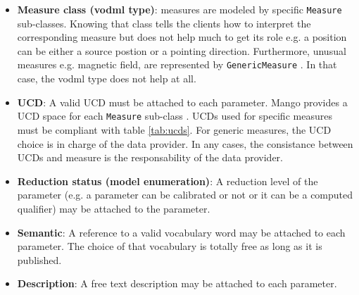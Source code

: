 \documentclass[11pt,a4paper]{ivoa}
\begin{document}
\begin{itemize}
    \item \textbf{Measure class (vodml type)}: measures are modeled by specific  \texttt{Measure} sub-classes.
              Knowing that class tells the clients  how to interpret the corresponding measure but does not help much to get its role e.g. a position can be either a source postion or a pointing direction.
              Furthermore, unusual measures e.g. magnetic field,  are represented by  \texttt{GenericMeasure} . 
              In that case, the vodml type does not help at all.
    \item \textbf{UCD}: A valid UCD must be attached to each parameter. 
              Mango provides a UCD space for each \texttt{Measure} sub-class . 
              UCDs used for specific measures must be compliant with table \ref{tab:ucds}. 
              For generic measures, the UCD choice is in charge of the data provider. 
              In any cases, the consistance between UCDs and measure is the responsability of the data provider.
 
    \item \textbf{Reduction status (model enumeration)}: A reduction level of the parameter (e.g. a parameter can be calibrated or not or it can be a computed qualifier) may be attached to the parameter.
    \item \textbf{Semantic}: A reference to  a valid vocabulary word may be attached to each parameter. The choice of that vocabulary is totally free as long as it is published.
    \item \textbf{Description}: A free text description may be attached to each parameter.
 \end{itemize}
\end{document}
